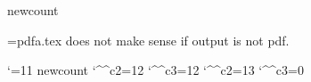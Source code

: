 
\ifx\pdfoutput\undefined \csname newcount\endcsname\pdfoutput \fi

\let\next=\endinput
\ifcase\pdfoutput
 \errhelp={pdfa.tex does not make sense if output is not pdf.}
\else
 \let\next=\relax
\fi
\next


\catcode`\@=11
\ifx\count@@\undefined \csname newcount\endcsname\count@@\fi
\edef\Acircumflexcatcode{\the\catcode`\^^c2}
\edef\Atildecatcode{\the\catcode`\^^c3}
\ifx\Acircumflex\undefined \catcode`\^^c2=12 \edef\Acircumflex{^^c3}\fi
\ifx\Atilde\undefined \catcode`\^^c3=12 \edef\Atilde{^^c3}\fi
\catcode`\^^c2=13
\catcode`\^^c3=0

\def\@gobble#1{}
\def\hash{\expandafter\@gobble\string\#}
\def\amp{\expandafter\@gobble\string\&}
\def\htmlAmp{\amp\hash x0026;}
\def\htmlCopyright{\amp\hash x00A9;}

\def\dountil#1\continue{\def\body{#1}\reiterate}
\def\reiterate{\body \let\next\relax \else \let\next\reiterate \fi \next}
\let\continue=\fi

\def\allhighother{\count@=128 %
 \loop \catcode\count@=12 \ifnum\count@<255 \advance\count@ by 1\repeat}

\def\@utf{\allhighother \catcode`\^^c2=13 \catcode`\^^c3=0 }

\ifx\xmpTitle\undefined \let\xmpTitle\empty \fi
\ifx\xmpAuthor\undefined \let\xmpAuthor\empty \fi
\ifx\xmpOrg\undefined \let\xmpOrg\empty \fi
\ifx\xmpCopyright\undefined \let\xmpCopyright\empty \fi
\ifx\xmpOwner\undefined \let\xmpOwner\xmpAuthor \fi
\ifx\xmpWebStatement\undefined \let\xmpWebStatement\empty \fi
\ifx\xmpCertificate\undefined \let\xmpCertificate\empty \fi
\ifx\xmpUsageTerms\undefined \let\xmpUsageTerms\empty \fi
\ifx\xmpDoi\undefined \let\xmpDoi\empty \fi
\ifx\xmpSubject\undefined \let\xmpSubject\empty \fi
\ifx\xmpKeywords\undefined \let\xmpKeywords\empty \fi
\ifx\xmpJournaltitle\undefined \let\xmpJournaltitle\empty \fi
\ifx\xmpJournalnumber\undefined \let\xmpJournalnumber\empty \fi
\ifx\xmpVolume\undefined \let\xmpVolume\empty \fi
\ifx\xmpIssue\undefined \let\xmpIssue\empty \fi
\ifx\xmpCoverDate\undefined \let\xmpCoverDate\empty \fi
\ifx\xmpCoverDisplayDate\undefined \let\xmpCoverDisplayDate\empty \fi
\ifx\xmpFirstpage\undefined \let\xmpFirstpage\empty \fi
\ifx\xmpLastpage\undefined \let\xmpLastpage\empty \fi
\ifx\xmpCreator\undefined {}\fi
\ifx\xmpProducer\undefined {}\fi
\ifx\xmpCreatorTool\undefined \def\xmpCreatorTool{\xmpCreator}\fi

